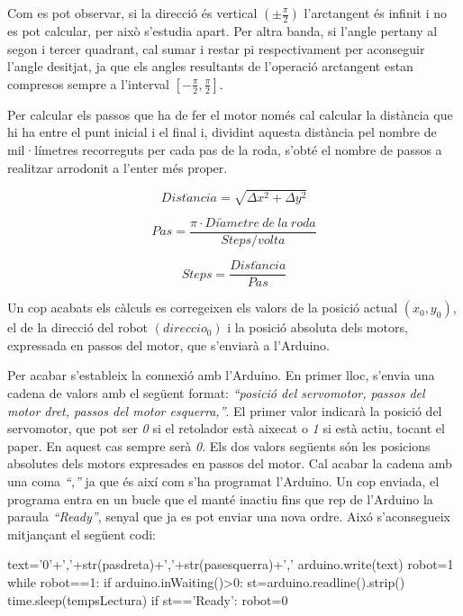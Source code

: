 Com es pot observar, si la direcció és vertical $(\pm\frac{\pi}{2})$  l’arctangent és infinit i no es pot calcular, per això s’estudia apart. Per altra banda, si l’angle pertany al segon i tercer quadrant, cal sumar i restar pi respectivament per aconseguir l’angle desitjat, ja que els angles resultants de l’operació arctangent estan compresos sempre a l’interval $[-\frac{\pi}{2}, \frac{\pi}{2}]$.

Per calcular els passos que ha de fer el motor només cal calcular la distància que hi ha entre el punt inicial i el final i, dividint aquesta distància pel nombre de mil·límetres recorreguts per cada pas de la roda, s’obté el nombre de passos a realitzar arrodonit a l'enter més proper. 

\begin{equation}\label{eq:dist}
Dist\grave{a}ncia=\sqrt{\Delta x^2+ \Delta y^2}
\end{equation}

\begin{equation}\label{eq:pas}
Pas=\frac{\pi\cdot Di\grave{a}metre \ de \ la \ roda}{Steps/volta}
\end{equation}

\begin{equation}\label{eq:steps}
Steps=\frac{Dist\grave{a}ncia}{Pas}
\end{equation}


Un cop acabats els càlculs es corregeixen els valors de la posició actual $(x_{0},y_{0})$, el de la direcció del robot $(direccio_{0})$ i la posició absoluta dels motors, expressada en passos del motor, que s’enviarà a l'Arduino. 

Per acabar s’estableix la connexió amb l’Arduino. En primer lloc, s’envia una cadena de valors amb el següent format: \emph{“posició del servomotor, passos del motor dret, passos del motor esquerra,”}. El primer valor indicarà la posició del servomotor, que pot ser \emph{0} si el retolador està aixecat o \emph{1} si està actiu, tocant el paper. En aquest cas sempre serà \emph{0}. Els dos valors següents són les posicions absolutes dels motors expresades en passos del motor. Cal acabar la cadena amb una coma \emph{“,”} ja que és així com s’ha programat l’Arduino. Un cop enviada, el programa entra en un bucle que el manté inactiu fins que rep de l’Arduino la paraula \emph{“Ready”}, senyal que ja es pot enviar una nova ordre. Aixó s’aconsegueix mitjançant el següent codi:

\begin{python}
	text='0'+','+str(pasdreta)+','+str(pasesquerra)+','
	arduino.write(text)
	robot=1
	while robot==1:
		if arduino.inWaiting()>0:
			st=arduino.readline().strip()
			time.sleep(tempsLectura)
		if st=='Ready':
			robot=0
\end{python}

